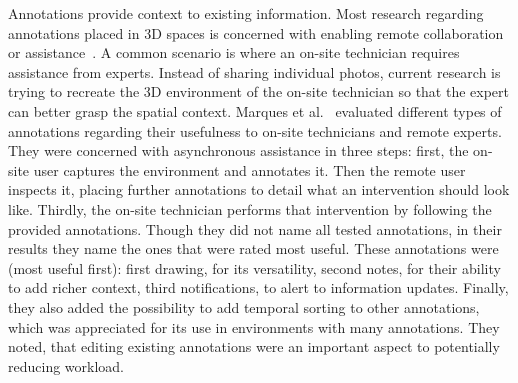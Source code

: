 Annotations provide context to existing information. Most research regarding annotations placed in 3D spaces is concerned with enabling remote collaboration or assistance~\cite{vuforiaAnnotations, annotations1, annotations2}. A common scenario is where an on-site technician requires assistance from experts. Instead of sharing individual photos, current research is trying to recreate the 3D environment of the on-site technician so that the expert can better grasp the spatial context.
%
Marques et al.~\cite{vuforiaAnnotations} evaluated different types of annotations regarding their usefulness to on-site technicians and remote experts. They were concerned with asynchronous assistance in three steps: first, the on-site user captures the environment and annotates it. Then the remote user inspects it, placing further annotations to detail what an intervention should look like. Thirdly, the on-site technician performs that intervention by following the provided annotations. Though they did not name all tested annotations, in their results they name the ones that were rated most useful. These annotations were (most useful first): first drawing, for its versatility, second notes, for their ability to add richer context, third notifications, to alert to information updates. Finally, they also added the possibility to add temporal sorting to other annotations, which was appreciated for its use in environments with many annotations. They noted, that editing existing annotations were an important aspect to potentially reducing workload.
